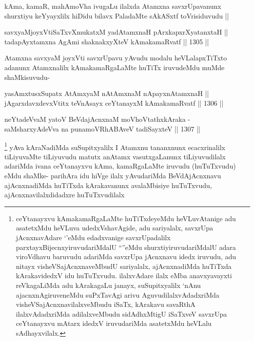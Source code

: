 \begin{artha}
kAma, kamaR, mahAmoVha ivugaLu ilalxda Atamxna savxrUpavanunx shurxtiyu keYyayxlilx hiDidu bilavx PaladaMte sAkASxtf toVrisiduvudu ||
\end{artha}


\begin{shl}
savxyaMjoyxVtiSaTxvXmukatxM yadAtamxnaH pArxkapxrXyatanxtaH || \\
tadapAyxtamxna AgAmi shaknakxyXteV kAmakamaRvatf ||  1305 ||  
\end{shl}

\begin{artha}
Atamxna savxyaM joyxVti savxrUpavu yAvudu modalu heVLalapxTiTxto adanunx Atamxnalilx kAmakamaRgaLaMte huTiTx iruvudeMdu muMde shaMkisuvudu-
\end{artha}

\begin{shl}
yasAmxtusxSupatx AtAmx\s yaM nA\s \s tAmxnaM nApayxnAtamxnaH || \\
jAgarxdavxdevxVtitx teVnAsayx ceYtanayxM kAmakamaRvatf ||  1306 ||  
\end{shl}
				
\begin{shl}
neYtadeVvaM yatoV BeVdajAcnxnaM moVhoVtathxkAraka -\\
saMsharxyAdeVva na punamoVRhABAveV tadiSayxteV ||  1307 ||  
\end{shl}

\begin{artha}
\footnote{ceYtanayxvu kAmakamaRgaLaMte huTiTxdeyeMdu heVLuvAtanige adu asatetxMdu heVLuva udedxVshavAgide, adu sariyalalx, savxrUpa jAcnxnavAdare `\stext'eMdu edadxvanige savxrUpadalilx parxtayxBijecnxyiruvudariMdalU ``\stext''eMdu shurxtiyiruvudariMdalU adara viroVdhavu baruvudu adariMda savxrUpa jAcnxnavu idedx iruvudu, adu nitayx visheVSajAcnxnaveMbudU sariyalalx, ajAcnxnadiMda huTiTxda kArakavidedxV idu huTuTxvudu. ilalxvAdare ilalx eMba anavxyavayxti reVkagaLiMda adu kArakagaLu janayx, suSupitxyalilx `nAnu ajacnxnAgiruveneMdu suPxTavAgi arivu AguvudilalxvAdadxriMda visheVSajAcnxnavilalxveMbudu iSaTx, kArakavu savaRthA ilalxvAdadxriMda adilalxveMbudu sidAdhxMtigU iSaTxveV savxrUpa ceYtanayxvu mAtarx idedxV iruvudariMda asatetxMdu heVLalu sAdhayxvilalx.}
yAva kAraNadiMda suSupitxyalilx I Atamxnu tananxnunx ecacxrinalilx tiLiyuvaMte tiLiyuvudu matutx anAtamx vasutxgaLanunx tiLiyuvudilalx adariMda ivana ceYtanayxvu kAma, kamaRgaLaMte iruvudu (huTuTxvudu) eMdu shaMke-
parihAra idu hiVge ilalx yAvudariMda BeVdAjAcnxnavu ajAcnxnadiMda huTiTxda kArakavanunx avalaMbisiye huTuTxvudu, ajAcnxnavilalxdidadxre huTuTxvudilalx
\end{artha}

